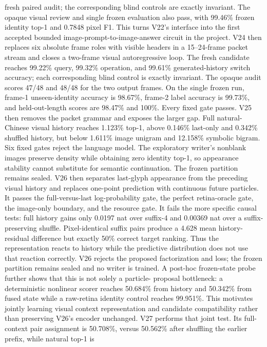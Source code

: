 \documentclass[11pt]{article}
\begin{document}
fresh paired audit; the corresponding blind controls are exactly invariant.
The opaque visual review and single frozen evaluation also pass, with 99.46\%
frozen identity top-1 and 0.7848 pixel F1. This turns V22's interface into the
first accepted bounded image-prompt-to-image-answer circuit in the project.
V24 then replaces six absolute frame roles with visible headers in a
15--24-frame packet stream and closes a two-frame visual autoregressive loop.
The fresh candidate reaches 99.22\% query, 99.32\% operation, and 99.61\%
generated-history switch accuracy; each corresponding blind control is exactly
invariant. The opaque audit scores 47/48 and 48/48 for the two output frames.
On the single frozen run, frame-1 unseen-identity accuracy is 98.67\%,
frame-2 label accuracy is 99.73\%, and held-out-length scores are 98.47\% and
100\%. Every fixed gate passes.
V25 then removes the packet grammar and exposes the larger gap. Full natural-
Chinese visual history reaches 1.123\% top-1, above 0.146\% last-only and
0.342\% shuffled history, but below 1.611\% image unigram and 12.158\%
symbolic bigram. Six fixed gates reject the language model. The exploratory
writer's nonblank images preserve density while obtaining zero identity
top-1, so appearance stability cannot substitute for semantic continuation.
The frozen partition remains sealed.
V26 then separates last-glyph appearance from the preceding visual history and
replaces one-point prediction with continuous future particles. It passes the
full-versus-last log-probability gate, the perfect retina-oracle gate, the
image-only boundary, and the resource gate. It fails the more specific causal
tests: full history gains only 0.0197 nat over suffix-4 and 0.00369 nat over a
suffix-preserving shuffle. Pixel-identical suffix pairs produce a 4.628 mean
history-residual difference but exactly 50\% correct target ranking. Thus the
representation reacts to history while the predictive distribution does not
use that reaction correctly. V26 rejects the proposed factorization and loss;
the frozen partition remains sealed and no writer is trained.
A post-hoc frozen-state probe further shows that this is not solely a particle-
proposal bottleneck: a deterministic nonlinear scorer reaches 50.684\% from
history and 50.342\% from fused state while a raw-retina identity control reaches
99.951\%. This motivates jointly learning visual context representation and
candidate compatibility rather than preserving V26's encoder unchanged.
V27 performs that joint test. Its full-context pair assignment is 50.708\%,
versus 50.562\% after shuffling the earlier prefix, while natural top-1 is
\end{document}
